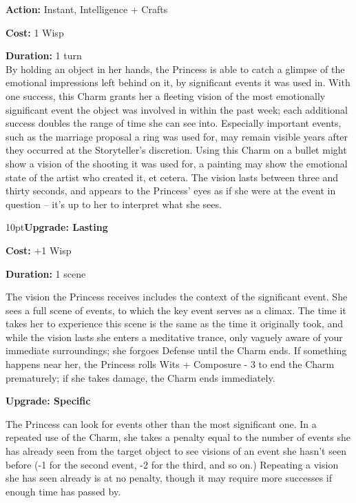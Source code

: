 \noindent \textbf{Action:} Instant, Intelligence + Crafts

\noindent \textbf{Cost:} 1 Wisp

\noindent \textbf{Duration:} 1 turn \\

\noindent By holding an object in her hands, the Princess is able to catch a glimpse of the emotional impressions left behind on it, by significant events it was used in. With one success, this Charm grants her a fleeting vision of the most emotionally significant event the object was involved in within the past week; each additional success doubles the range of time she can see into. Especially important events, such as the marriage proposal a ring was used for, may remain visible years after they occurred at the Storyteller's discretion. Using this Charm on a bullet might show a vision of the shooting it was used for, a painting may show the emotional state of the artist who created it, et cetera. The vision lasts between three and thirty seconds, and appears to the Princess' eyes as if she were at the event in question -- it's up to her to interpret what she sees.

\begin{myindentpar}{10pt}\textbf{Upgrade: Lasting}

\noindent \textbf{Cost:} +1 Wisp

\noindent \textbf{Duration:} 1 scene 

The vision the Princess receives includes the context of the significant event. She sees a full scene of events, to which the key event serves as a climax. The time it takes her to experience this scene is the same as the time it originally took, and while the vision lasts she enters a meditative trance, only vaguely aware of your immediate surroundings; she forgoes Defense until the Charm ends. If something happens near her, the Princess rolls Wits + Composure - 3 to end the Charm prematurely; if she takes damage, the Charm ends immediately.

\textbf{Upgrade: Specific}

The Princess can look for events other than the most significant one. In a repeated use of the Charm, she takes a penalty equal to the number of events she has already seen from the target object to see visions of an event she hasn't seen before (-1 for the second event, -2 for the third, and so on.) Repeating a vision she has seen already is at no penalty, though it may require more successes if enough time has passed by.\end{myindentpar}


